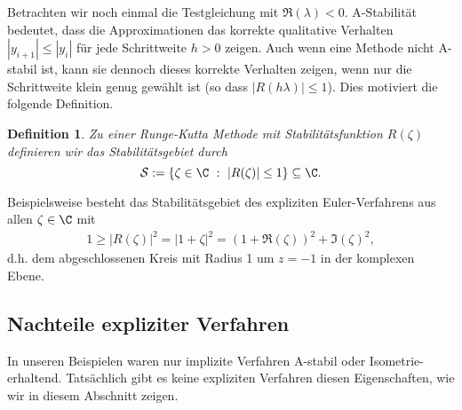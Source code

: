 \documentclass[
]{mycourse}
\theoremstyle{mythm}
\newtheorem{definition}[theorem]{Definition}
\theoremstyle{break}
\begin{document}
Betrachten wir noch einmal die Testgleichung mit $\Re(\lambda)<0$. A-Stabilität bedeutet, dass die Approximationen das 
korrekte qualitative Verhalten 
$|y_{i+1}|\leq |y_i|$ für jede Schrittweite $h>0$ zeigen. Auch wenn eine Methode nicht A-stabil ist, kann sie dennoch dieses
korrekte Verhalten zeigen, wenn nur die Schrittweite klein genug gewählt ist (so dass $|R(h\lambda)|\leq 1$).
Dies motiviert die folgende Definition.

\begin{definition}
Zu einer Runge-Kutta Methode mit Stabilitätsfunktion $R(\zeta)$ definieren wir 
das \emph{Stabilitätsgebiet} durch 
\[
\mathcal S:=\left\{ \zeta\in \C\ : \ |R(\zeta)|\leq 1\right\}\subseteq \C.
\]
\end{definition}

Beispielsweise besteht das Stabilitätsgebiet des expliziten Euler-Verfahrens 
aus allen $\zeta\in \C$ mit
\begin{align*}
1\geq |R(\zeta)|^2=|1+\zeta|^2=(1+\Re(\zeta))^2+\Im(\zeta)^2,
\end{align*}
d.h. dem abgeschlossenen Kreis mit Radius 1 um $z=-1$ in der komplexen Ebene. 


\subsection{Nachteile expliziter Verfahren}\label{subsect:limit_expl}

In unseren Beispielen waren nur implizite Verfahren A-stabil oder Isometrie-erhaltend. Tatsächlich
gibt es keine expliziten Verfahren diesen Eigenschaften, wie wir in diesem Abschnitt zeigen.
\end{document}
